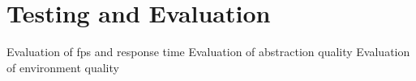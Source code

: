 \chapter{Testing and Evaluation}
\label{chapter:eval}

Evaluation of fps and response time
Evaluation of abstraction quality
Evaluation of environment quality
